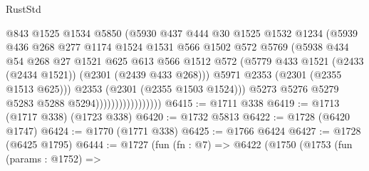 \begin{lexlean}{RustStd}
\begin{coremodule}
{\begin{coremodule}
{{{{{{{{{{{{{                                    @843
                                    @1525
                                    @1534
                                    @5850
                                    (@5930
                                      @437
                                      @444
                                      @30
                                      @1525
                                      @1532
                                      @1234
                                      (@5939
                                        @436
                                        @268
                                        @277
                                        @1174
                                        @1524
                                        @1531
                                        @566
                                        @1502
                                        @572
                                        @5769
                                        (@5938
                                          @434
                                          @54
                                          @268
                                          @27
                                          @1521
                                          @625
                                          @613
                                          @566
                                          @1512
                                          @572
                                          (@5779
                                            @433
                                            @1521
                                            (@2433 (@2434 @1521))
                                            (@2301 (@2439 @433 @268)))
                                          @5971
                                          @2353
                                          (@2301 (@2355 @1513 @625)))
                                        @2353
                                        (@2301 (@2355 @1503 @1524)))
                                      @5273
                                      @5276
                                      @5279
                                      @5283
                                      @5288
                                      @5294)))))))))))))))))
@6415 := @1711 @338
@6419 := @1713 (@1717 @338) (@1723 @338)
@6420 := @1732 @5813
@6422 := @1728 (@6420 @1747)
@6424 := @1770 (@1771 @338)
@6425 := @1766 @6424
@6427 := @1728 (@6425 @1795)
@6444 := @1727
    (fun (fn : @7) =>
    @6422
      (@1750
        (@1753
          (fun (params : @1752) =>
}}}}}}}}}}}}}
\end{coremodule}}
\end{coremodule}
\end{lexlean}
